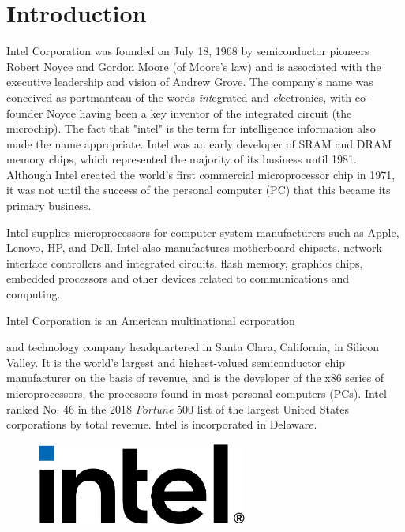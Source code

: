 


\section{Introduction}

Intel Corporation was founded on July 18, 1968 by semiconductor pioneers
Robert Noyce and Gordon Moore (of Moore's law) and is associated with
the executive leadership and vision of Andrew Grove. The company's name
was conceived as portmanteau of the words \emph{int}egrated and
\emph{el}ectronics, with co-founder Noyce having been a key inventor of
the integrated circuit (the microchip). The fact that "intel" is the
term for intelligence information also made the name appropriate. Intel
was an early developer of SRAM and DRAM memory chips, which represented
the majority of its business until 1981. Although Intel created the
world's first commercial microprocessor chip in 1971, it was not until
the success of the personal computer (PC) that this became its primary
business.

Intel supplies microprocessors for computer system manufacturers such as
Apple, Lenovo, HP, and Dell. Intel also manufactures motherboard
chipsets, network interface controllers and integrated circuits, flash
memory, graphics chips, embedded processors and other devices related to
communications and computing.


Intel Corporation is an American multinational corporation

and technology company headquartered in Santa Clara, California, in Silicon
Valley. It is the world's largest and highest-valued semiconductor chip
manufacturer on the basis of revenue, and is the developer of the x86
series of microprocessors, the processors found in most personal
computers (PCs). Intel ranked No. 46 in the 2018 \emph{Fortune} 500 list
of the largest United States corporations by total revenue. Intel is
incorporated in Delaware.

\begin{figure}[ht!]
	\centering
\includegraphics[width=2.72896in,height=1.08604in]{media/image2.jpeg}
\end{figure}



